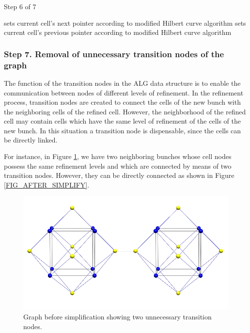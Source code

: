 \begin{algorithm}[!ht]
    \caption{Step 6 of 7}
    \small{
    \begin{algorithmic}[1]
            \State sets current cell's next pointer according to modified Hilbert curve algorithm
            \State sets current cell's previous pointer according to modified Hilbert curve algorithm
        \EndFor
    \end{algorithmic}
    }
    \label{STEP_6_REFINEMENT}
\end{algorithm}


\subsubsection*{Step 7. Removal of unnecessary transition nodes of the graph}
The function of the transition nodes in the ALG data structure is to
enable the communication between nodes of different levels of
refinement. In the refinement process, transition nodes are created
to connect the cells of the new bunch with the neighboring cells of
the refined cell. However, the neighborhood of the refined cell may
contain cells which have the same level of refinement of the cells
of the new bunch. In this situation a transition node is
dispensable, since the cells can be directly linked.

For instance, in Figure \ref{FIG_BEFORE_SIMPLIFY}, we have two
neighboring bunches whose cell nodes possess the same refinement
levels and which are connected by means of two transition nodes.
However, they can be directly connected as shown in Figure
\ref{FIG_AFTER_SIMPLIFY}.

\begin{figure}[!ht]
    \centering
    \includegraphics[scale=0.20,angle=0]{../img/graphNotSimplified.jpg}
    \caption{Graph before simplification showing two unnecessary transition nodes.}
    \label{FIG_BEFORE_SIMPLIFY}
\end{figure}


